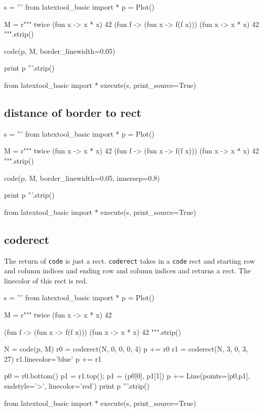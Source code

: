 \begin{python}
s = '''
from latextool_basic import *
p = Plot()

M = r"""
twice (fun x -> x * x) 42
(fun f -> (fun x -> f(f x))) (fun x -> x * x) 42
""".strip()
    
code(p, M, border_linewidth=0.05)

print p
'''.strip()

from latextool_basic import *
execute(s, print_source=True)
\end{python}




\newpage
\subsection{distance of border to rect}

\begin{python}
s = '''
from latextool_basic import *
p = Plot()

M = r"""
twice (fun x -> x * x) 42
(fun f -> (fun x -> f(f x))) (fun x -> x * x) 42
""".strip()
    
code(p, M, border_linewidth=0.05, innersep=0.8)

print p
'''.strip()

from latextool_basic import *
execute(s, print_source=True)
\end{python}




\newpage
\subsection{coderect}

The return of \verb!code! is just a rect.
\verb!coderect! takes in a \verb!code! rect and
starting row and column indices and
ending row and column indices and returns a rect.
The linecolor of this rect is red.

\begin{python}
s = '''
from latextool_basic import *
p = Plot()

M = r"""
twice (fun x -> x * x) 42


(fun f -> (fun x -> f(f x))) (fun x -> x * x) 42
""".strip()
    
N = code(p, M)
r0 = coderect(N, 0, 0, 0, 4)
p += r0
r1 = coderect(N, 3, 0, 3, 27)
r1.linecolor='blue'
p += r1

p0 = r0.bottom()
p1 = r1.top(); p1 = (p0[0], p1[1])
p += Line(points=[p0,p1], endstyle='>', linecolor='red')
print p
'''.strip()

from latextool_basic import *
execute(s, print_source=True)
\end{python}




